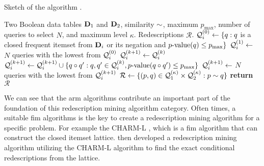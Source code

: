 \begin{algorithm}[tb]
    \caption{Sketch of the \algMID{} algorithm \citep{galbrun2018redescription}.}
      \label{alg:MID}
    \begin{algorithmic}[1]
    \small
      \Require Two Boolean data tables $\mathbf{D}_1$ and $\mathbf{D}_2$, similarity $\sim$, maximum \pvalue{} $p_{\max}$, number of queries to select $N$, and maximum level $\kappa$.
      \Ensure Redescriptions $\mathcal{R}$.
       \State $\mathcal{Q}^{(0)}_i \gets \{ q : q$ is a closed frequent itemset from $\mathbf{D}_i$ or its negation and $ \pvalue(\query) \leq p_{\max}\}$ \label{alg:MID:mine} %
       \State $\mathcal{Q}^{(1)}_i \gets$  $N$ queries with the lowest \pvalue from $\mathcal{Q}^{(0)}_i$ 
         \State $\mathcal{Q}^{(k+1)}_i \gets \mathcal{Q}^{(k)}_i$
            \State $\Queries^{(k+1)}_i \gets \Queries^{(k+1)}_i \cup \{ \query \lop \query' : \query, \query' \in \Queries^{(k)}_i, \pvalue(\query \lop \query') \leq p_{\max}\}$ \label{alg:MID:combine}
      \EndFor
       \State $\mathcal{Q}^{(k+1)}_i \gets$  $N$ queries with the lowest \pvalue from $\mathcal{Q}^{(k+1)}_i$ \label{alg:MID:filter}
      \EndFor
      \EndFor
      \State $\mathcal{R} \gets \{(p, q) \in \mathcal{Q}^{(\kappa)}_1 \times \mathcal{Q}^{(\kappa)}_2  : p \sim q\}$ \label{alg:MID:pair} %
      \State \textbf{return} $\mathcal{R}$
    \end{algorithmic}
\end{algorithm}

We can see that the \acl{arm} algorithms contribute an important part of the foundation of this redescription mining algorithm category.
Often times, a suitable \ac{fim} algorithms is the key to create a redescription mining algorithm for a specific problem.
For example the CHARM-L \citep{zakihsiao2005}, which is a \ac{fim} algorithm that can construct the closed itemset lattice.
 then developed a redescription mining algorithm utilizing the CHARM-L algorithm to find the exact conditional redescriptions from the lattice.